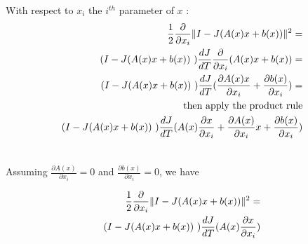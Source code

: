 \documentclass{article}
\begin{document}
 With respect to $x_i$ the $i^{th}$ parameter of $x$ :
\begin{eqnarray}
\frac{1}{2}\frac{\partial} {\partial x_{i}} \| I - J (  A(x) x + b(x) ) \|^2 = \\ \notag
( I - J (  A(x) x + b(x))~) \frac{d J}{dT} \frac{\partial} {\partial
  x_{i}}(  A(x) x + b(x) ) = \\ \notag
( I - J (  A(x) x + b(x))~) \frac{d J}{dT} ( \frac{\partial A(x) x } {\partial
  x_{i}} +  \frac{\partial b(x) } {\partial
  x_{i}}    ) = \\ \notag
\text{then apply the product rule}\\ \notag
( I - J (  A(x) x + b(x))~) \frac{d J}{dT} (  A(x) \frac{\partial x } {\partial
  x_{i}}  +  \frac{\partial A(x) } {\partial
  x_{i}}x +  \frac{\partial b(x) } {\partial
  x_{i}}    )  \\ \notag
 \end{eqnarray}

 Assuming $\frac{\partial A(x) } {\partial x_{i}}=0$ and $\frac{\partial b(x) } {\partial x_{i}}=0$, we have

\begin{eqnarray}
\frac{1}{2}\frac{\partial} {\partial x_{i}} \| I - J (  A(x) x + b(x) ) \|^2 = \\ \notag
( I - J (  A(x) x + b(x))~) \frac{d J}{dT} (  A(x) \frac{\partial x } {\partial
  x_{i}}  )  \\ \notag
\end{eqnarray}
\end{document}
